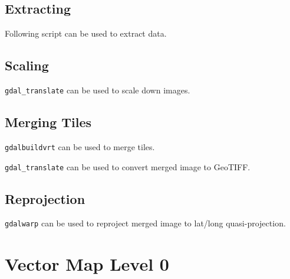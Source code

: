 \subsection{Extracting}

Following script can be used to extract data.

\begin{codelistbash}
  
\end{codelistbash}

\subsection{Scaling}

\texttt{gdal\_translate} can be used to scale down images.

\begin{codelistbash}
  
\end{codelistbash}

\subsection{Merging Tiles}

\texttt{gdalbuildvrt} can be used to merge tiles.

\begin{codelistbash}
  
\end{codelistbash}

\texttt{gdal\_translate} can be used to convert merged image to GeoTIFF.

\begin{codelistbash}
  
\end{codelistbash}

\subsection{Reprojection}

\texttt{gdalwarp} can be used to reproject merged image to lat/long quasi-projection.

\begin{codelistbash}
  
\end{codelistbash}

\section{Vector Map Level 0}

